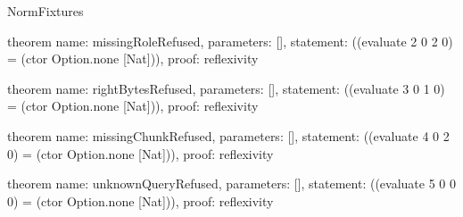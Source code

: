 \begin{lexlean}{NormFixtures}
\begin{semanticmodule}
theorem{
  name: missingRoleRefused,
  parameters: [],
  statement: ((evaluate 2 0 2 0) = (ctor Option.none [Nat])),
  proof: reflexivity{}
}

theorem{
  name: rightBytesRefused,
  parameters: [],
  statement: ((evaluate 3 0 1 0) = (ctor Option.none [Nat])),
  proof: reflexivity{}
}

theorem{
  name: missingChunkRefused,
  parameters: [],
  statement: ((evaluate 4 0 2 0) = (ctor Option.none [Nat])),
  proof: reflexivity{}
}

theorem{
  name: unknownQueryRefused,
  parameters: [],
  statement: ((evaluate 5 0 0 0) = (ctor Option.none [Nat])),
  proof: reflexivity{}
}
\end{semanticmodule}
\end{lexlean}

